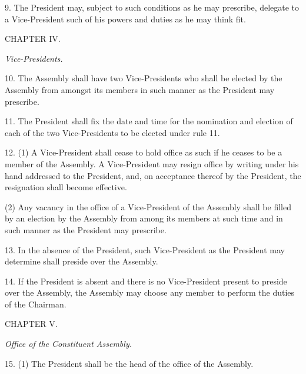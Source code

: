9. The President may, subject to such conditions as he may prescribe, delegate to a Vice-President such of his powers and duties as he may think fit.



\begin{center}
CHAPTER IV.\end{center}
\begin{center}
\emph{Vice-Presidents.}\end{center}


10. The Assembly shall have two Vice-Presidents who shall be elected by the Assembly from amongst its members in such manner as the President may prescribe.



11. The President shall fix the date and time for the nomination and election of each of the two Vice-Presidents to be elected under rule 11.



12. (1) A Vice-President shall cease to hold office as such if he ceases to be a member of the Assembly. A Vice-President may resign office by writing under his hand addressed to the President, and, on acceptance thereof by the President, the resignation shall become effective.



(2) Any vacancy in the office of a Vice-President of the Assembly shall be filled by an election by the Assembly from among its members at such time and in such manner as the President may prescribe.



13. In the absence of the President, such Vice-President as the President may determine shall preside over the Assembly.



14. If the President is absent and there is no Vice-President present to preside over the Assembly, the Assembly may choose any member to perform the duties of the Chairman.



\begin{center}
CHAPTER V.\end{center}
\begin{center}
\emph{Office of the Constituent Assembly.}\end{center}
\begin{center}
\end{center}
15. (1) The President shall be the head of the office of the Assembly.



